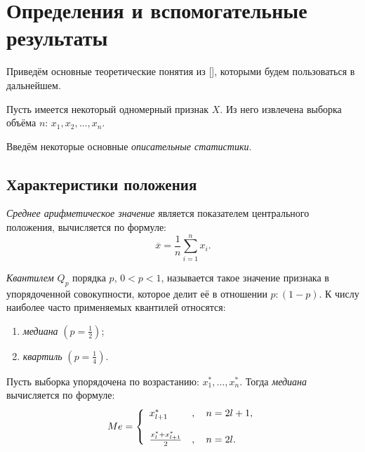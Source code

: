 \newpage
\chapter{Определения и вспомогательные результаты}

Приведём основные теоретические понятия из [], которыми будем пользоваться в дальнейшем.

Пусть имеется некоторый одномерный признак $X$. Из него извлечена выборка объёма $n$: $x_1, x_2, \ldots, x_n$.

Введём некоторые основные \textit{описательные статистики}.

\section*{Характеристики положения} %
\label{sec:chars_pos}

\textit{Среднее арифметическое значение} является показателем 
центрального положения, вычисляется по формуле:
\begin{equation*}
	\overline{x} = \frac{1}{n} \sum_{i=1}^n{x_i}.
\end{equation*}
 
\textit{Квантилем $Q_p$} порядка $p$, $0<p<1$, называется такое значение признака в упорядоченной совокупности, которое делит её в отношении $p: (1 - p)$. К числу наиболее часто применяемых квантилей относятся:
\begin{enumerate}
	\item \textit{медиана} $(p = \frac{1}{2})$;
	\item \textit{квартиль} $(p = \frac{1}{4})$.
\end{enumerate}

Пусть выборка упорядочена по возрастанию: $x_{1}^{*}, \ldots, x_{n}^{*}$. Тогда \textit{медиана} вычисляется по формуле:
\begin{equation*}
Me = \left\{
 \begin{array}{l l}
   x_{l+1}^{*} &, \quad n = 2l + 1, \\
   \\
   \frac{x_l^{*} + x_{l+1}^{*}}{2} &, \quad n = 2l.
 \end{array} \right.
\end{equation*}


